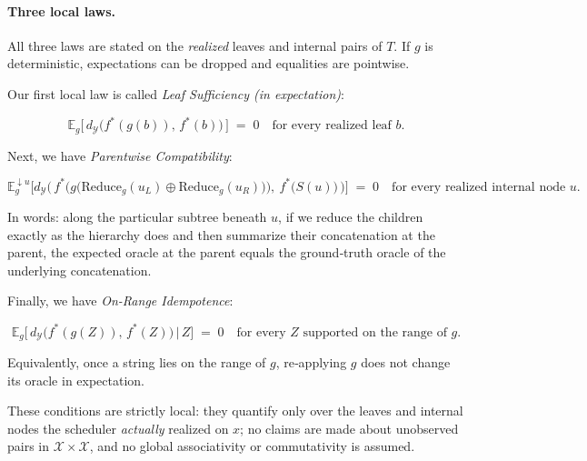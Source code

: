 \documentclass[11pt]{article}
\newcommand{\Strings}{\mathcal{X}}       %
\newcommand{\Y}{\mathcal{Y}}               %
\newcommand{\fstar}{f^*}               %
\newcommand{\E}{\mathbb{E}}
\newcommand{\concat}{\oplus}                    %
\newcommand{\metric}{d_{\Y}}
\newcommand{\reduce}{\text{Reduce}}
\newcommand{\reduceg}{\reduce_g}
\newcommand{\Eg}{\E_g}     %
\begin{document}
\paragraph{Three local laws.}
All three laws are stated on the \emph{realized} leaves and internal pairs of $T$. If $g$ is deterministic, expectations can be dropped and equalities are pointwise.



Our first local law is called \textit{Leaf Sufficiency (in expectation)}:

\begin{equation}\tag{L1}\label{eq:leaf_sufficiency}
\Eg\!\big[\,\metric\big(\fstar(g(b)),\,\fstar(b)\big)\,\big]\;=\;0
\quad\text{for every realized leaf }b.
\end{equation}

Next, we have \textit{Parentwise Compatibility}:

\begin{equation}\tag{L2}\label{eq:leaf_compatibility}
\Eg^{\downarrow u}\!\Big[
  \metric\Big(\,\fstar\!\big(g\!\big(\reduceg(u_L)\concat \reduceg(u_R)\big)\big),\
                 \fstar\!\big(S(u)\big)\,\Big)\Big]\;=\;0
\quad\text{for every realized internal node }u.
\end{equation}

In words: along the particular subtree beneath $u$, if we reduce the children exactly as the hierarchy does and then summarize their concatenation at the parent, the expected oracle at the parent equals the ground‑truth oracle of the underlying concatenation.


Finally, we have \textit{On-Range Idempotence}:

\begin{equation}\tag{L3}\label{eq:leaf_idempotence}
\Eg\!\big[\,\metric\big(\fstar(g(Z)),\,\fstar(Z)\big)\,\big|\,Z\big]\;=\;0
\quad\text{for every $Z$ supported on the range of $g$}.
\end{equation}

Equivalently, once a string lies on the range of $g$, re‑applying $g$ does not change its oracle in expectation.


These conditions are strictly local: they quantify only over the leaves and internal nodes the scheduler \emph{actually} realized on $x$; no claims are made about unobserved pairs in $\Strings\times\Strings$, and no global associativity or commutativity is assumed.
\end{document}
